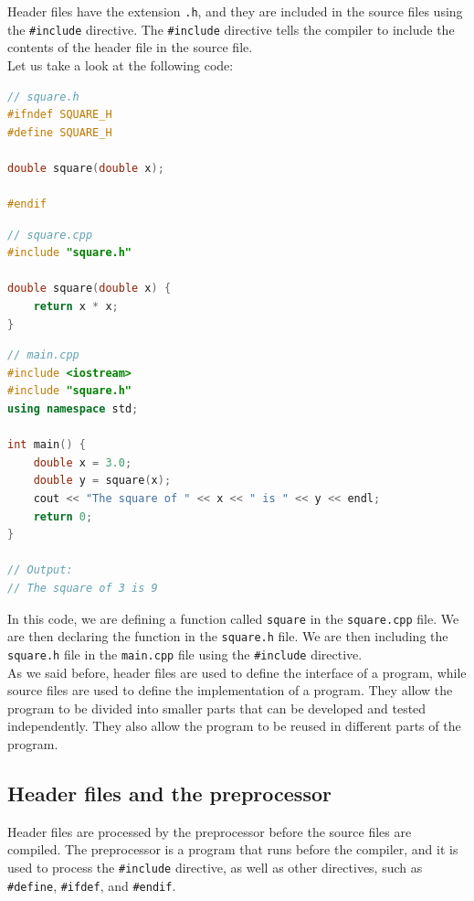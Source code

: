 Header files have the extension \texttt{.h}, and they are included in the source files using the \texttt{\#include} directive.
The \texttt{\#include} directive tells the compiler to include the contents of the header file in the source file.\\

Let us take a look at the following code:

\begin{lstlisting}[language=C++]
// square.h
#ifndef SQUARE_H
#define SQUARE_H

double square(double x);

#endif
\end{lstlisting}

\begin{lstlisting}[language=C++]
// square.cpp
#include "square.h"

double square(double x) {
    return x * x;
}
\end{lstlisting}

\begin{lstlisting}[language=C++]
// main.cpp
#include <iostream>
#include "square.h"
using namespace std;

int main() {
    double x = 3.0;
    double y = square(x);
    cout << "The square of " << x << " is " << y << endl;
    return 0;
}

// Output:
// The square of 3 is 9
\end{lstlisting}

In this code, we are defining a function called \texttt{square} in the \texttt{square.cpp} file. We are then declaring the
function in the \texttt{square.h} file. We are then including the \texttt{square.h} file in the \texttt{main.cpp} file using
the \texttt{\#include} directive.\\

As we said before, header files are used to define the interface of a program, while source files are used to define the 
implementation of a program. They allow the program to be divided into smaller parts that can be developed and tested 
independently. They also allow the program to be reused in different parts of the program.\\

\subsection{Header files and the preprocessor}

Header files are processed by the preprocessor before the source files are compiled. The preprocessor is a program that
runs before the compiler, and it is used to process the \texttt{\#include} directive, as well as other directives, such as
\texttt{\#define}, \texttt{\#ifdef}, and \texttt{\#endif}.\\

